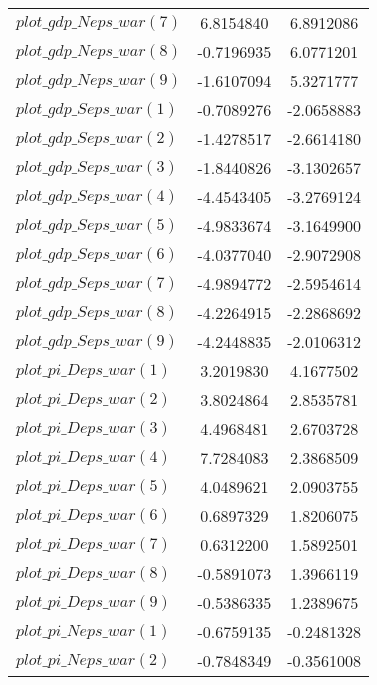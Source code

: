 \begin{center}
\begin{longtable}{lcc}
$plot\_gdp\_N eps\_war (7)  $	 & 	      6.8154840	 & 	      6.8912086 \\ 
$plot\_gdp\_N eps\_war (8)  $	 & 	     -0.7196935	 & 	      6.0771201 \\ 
$plot\_gdp\_N eps\_war (9)  $	 & 	     -1.6107094	 & 	      5.3271777 \\ 
$plot\_gdp\_S eps\_war (1)  $	 & 	     -0.7089276	 & 	     -2.0658883 \\ 
$plot\_gdp\_S eps\_war (2)  $	 & 	     -1.4278517	 & 	     -2.6614180 \\ 
$plot\_gdp\_S eps\_war (3)  $	 & 	     -1.8440826	 & 	     -3.1302657 \\ 
$plot\_gdp\_S eps\_war (4)  $	 & 	     -4.4543405	 & 	     -3.2769124 \\ 
$plot\_gdp\_S eps\_war (5)  $	 & 	     -4.9833674	 & 	     -3.1649900 \\ 
$plot\_gdp\_S eps\_war (6)  $	 & 	     -4.0377040	 & 	     -2.9072908 \\ 
$plot\_gdp\_S eps\_war (7)  $	 & 	     -4.9894772	 & 	     -2.5954614 \\ 
$plot\_gdp\_S eps\_war (8)  $	 & 	     -4.2264915	 & 	     -2.2868692 \\ 
$plot\_gdp\_S eps\_war (9)  $	 & 	     -4.2448835	 & 	     -2.0106312 \\ 
$plot\_pi\_D eps\_war (1)   $	 & 	      3.2019830	 & 	      4.1677502 \\ 
$plot\_pi\_D eps\_war (2)   $	 & 	      3.8024864	 & 	      2.8535781 \\ 
$plot\_pi\_D eps\_war (3)   $	 & 	      4.4968481	 & 	      2.6703728 \\ 
$plot\_pi\_D eps\_war (4)   $	 & 	      7.7284083	 & 	      2.3868509 \\ 
$plot\_pi\_D eps\_war (5)   $	 & 	      4.0489621	 & 	      2.0903755 \\ 
$plot\_pi\_D eps\_war (6)   $	 & 	      0.6897329	 & 	      1.8206075 \\ 
$plot\_pi\_D eps\_war (7)   $	 & 	      0.6312200	 & 	      1.5892501 \\ 
$plot\_pi\_D eps\_war (8)   $	 & 	     -0.5891073	 & 	      1.3966119 \\ 
$plot\_pi\_D eps\_war (9)   $	 & 	     -0.5386335	 & 	      1.2389675 \\ 
$plot\_pi\_N eps\_war (1)   $	 & 	     -0.6759135	 & 	     -0.2481328 \\ 
$plot\_pi\_N eps\_war (2)   $	 & 	     -0.7848349	 & 	     -0.3561008 \\ 

\end{longtable}
\end{center}
